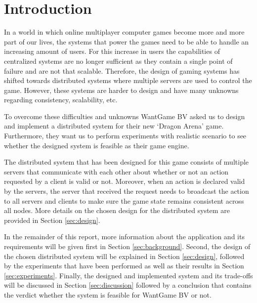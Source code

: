 \section{Introduction}
In a world in which online multiplayer computer games become more and more part of our lives, the systems that power the games need to be able to handle an increasing amount of users.
For this increase in users the capabilities of centralized systems are no longer sufficient as they contain a single point of failure and are not that scalable.
Therefore, the design of gaming systems has shifted towards distributed systems where multiple servers are used to control the game.
However, these systems are harder to design and have many unknowns regarding consistency, scalability, etc.

To overcome these difficulties and unknowns WantGame BV asked us to design and implement a distributed system for their new `Dragon Arena' game.
Furthermore, they want us to perform experiments with realistic scenario to see whether the designed system is feasible as their game engine.

The distributed system that has been designed for this game consists of multiple servers that communicate with each other about whether or not an action requested by a client is valid or not. 
Moreover, when an action is declared valid by the servers, the server that received the request needs to broadcast the action to all servers and clients to make sure the game state remains consistent across all nodes.
More details on the chosen design for the distributed system are provided in Section \ref{sec:design}.

In the remainder of this report, more information about the application and its requirements will be given first in Section \ref{sec:background}. 
Second, the design of the chosen distributed system will be explained in Section \ref{sec:design}, followed by the experiments that have been performed as well as their results in Section \ref{sec:experiments}.
Finally, the designed and implemented system and its trade-offs will be discussed in Section \ref{sec:discussion} followed by a conclusion that contains the verdict whether the system is feasible for WantGame BV or not.